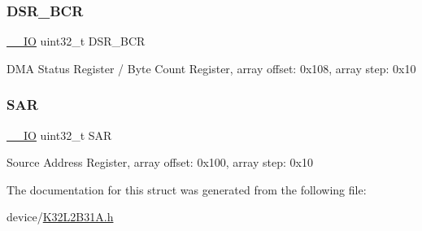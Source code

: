 \subsubsection{\texorpdfstring{DSR\_BCR}{DSR\_BCR}}
{\footnotesize\ttfamily \mbox{\hyperlink{core__cm0plus_8h_aec43007d9998a0a0e01faede4133d6be}{\+\_\+\+\_\+\+IO}} uint32\+\_\+t D\+S\+R\+\_\+\+B\+CR}

D\+MA Status Register / Byte Count Register, array offset\+: 0x108, array step\+: 0x10 \mbox{\label{struct_d_m_a___type_a03a428b9768794844191fe61a3e27f87}} 
\subsubsection{\texorpdfstring{SAR}{SAR}}
{\footnotesize\ttfamily \mbox{\hyperlink{core__cm0plus_8h_aec43007d9998a0a0e01faede4133d6be}{\+\_\+\+\_\+\+IO}} uint32\+\_\+t S\+AR}

Source Address Register, array offset\+: 0x100, array step\+: 0x10 

The documentation for this struct was generated from the following file\+:\begin{DoxyCompactItemize}
\item 
device/\mbox{\hyperlink{_k32_l2_b31_a_8h}{K32\+L2\+B31\+A.\+h}}\end{DoxyCompactItemize}
